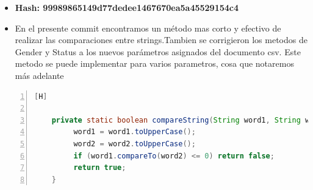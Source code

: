   \begin{itemize}
    \item \textbf{Hash: 99989865149d77dedee1467670ea5a45529154c4}
    \item En el presente commit encontramos un método mas corto y efectivo de realizar las comparaciones entre strings.Tambien se corrigieron los metodos de Gender y Status a los nuevos parámetros asignados del documento csv. Este metodo se puede implementar para varios parametros, cosa que notaremos más adelante
  \end{itemize}
  \begin{lstlisting}[language=Java, caption={Commit: Algunas correcciones}, numbers=left, firstnumber=1][H]
    
	private static boolean compareString(String word1, String word2){
   		 word1 = word1.toUpperCase();
   		 word2 = word2.toUpperCase();
   		 if (word1.compareTo(word2) <= 0) return false;
   		 return true;
  	}
  \end{lstlisting}


